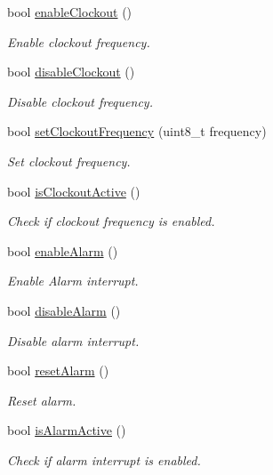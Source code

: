 \begin{DoxyCompactItemize}
bool \hyperlink{namespacePcf8563_a03e4ea0f00fd48664537788ba491fa60}{enable\+Clockout} ()
\begin{DoxyCompactList}\small\item\em Enable clockout frequency. \end{DoxyCompactList}\item 
bool \hyperlink{namespacePcf8563_a76c81b3e0f59f5e4e80dd8807c199856}{disable\+Clockout} ()
\begin{DoxyCompactList}\small\item\em Disable clockout frequency. \end{DoxyCompactList}\item 
bool \hyperlink{namespacePcf8563_a4bc96bd7ccbd30db659536befb3da1fe}{set\+Clockout\+Frequency} (uint8\+\_\+t frequency)
\begin{DoxyCompactList}\small\item\em Set clockout frequency. \end{DoxyCompactList}\item 
bool \hyperlink{namespacePcf8563_ab8ff6484e7a5636187e0212a98f623bf}{is\+Clockout\+Active} ()
\begin{DoxyCompactList}\small\item\em Check if clockout frequency is enabled. \end{DoxyCompactList}\item 
bool \hyperlink{namespacePcf8563_a6e196fe410c080e4f6e20aadbe279637}{enable\+Alarm} ()
\begin{DoxyCompactList}\small\item\em Enable Alarm interrupt. \end{DoxyCompactList}\item 
bool \hyperlink{namespacePcf8563_ad9dd3fe9bf1ab196090357b717c7207d}{disable\+Alarm} ()
\begin{DoxyCompactList}\small\item\em Disable alarm interrupt. \end{DoxyCompactList}\item 
bool \hyperlink{namespacePcf8563_ae554435cc17a3e49d9d731b97e3fc0be}{reset\+Alarm} ()
\begin{DoxyCompactList}\small\item\em Reset alarm. \end{DoxyCompactList}\item 
bool \hyperlink{namespacePcf8563_a23086671303b630318e82e9bef662b44}{is\+Alarm\+Active} ()
\begin{DoxyCompactList}\small\item\em Check if alarm interrupt is enabled. \end{DoxyCompactList}\item 

\end{DoxyCompactItemize}
